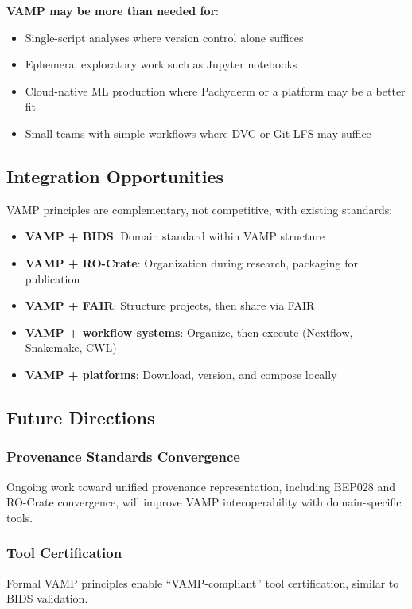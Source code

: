 \documentclass{article}
\begin{document}
\textbf{VAMP may be more than needed for}:
\begin{itemize}
    \item Single-script analyses where version control alone suffices
    \item Ephemeral exploratory work such as Jupyter notebooks
    \item Cloud-native ML production where Pachyderm or a platform may be a better fit
    \item Small teams with simple workflows where DVC or Git LFS may suffice
\end{itemize}

\subsection{Integration Opportunities}

VAMP principles are complementary, not competitive, with existing standards:
\begin{itemize}
    \item \textbf{VAMP + BIDS}: Domain standard within VAMP structure
    \item \textbf{VAMP + RO-Crate}: Organization during research, packaging for publication
    \item \textbf{VAMP + FAIR}: Structure projects, then share via FAIR
    \item \textbf{VAMP + workflow systems}: Organize, then execute (Nextflow, Snakemake, CWL)
    \item \textbf{VAMP + platforms}: Download, version, and compose locally
\end{itemize}

\subsection{Future Directions}

\subsubsection{Provenance Standards Convergence}
Ongoing work toward unified provenance representation, including BEP028 and RO-Crate convergence, will improve VAMP interoperability with domain-specific tools.

\subsubsection{Tool Certification}
Formal VAMP principles enable ``VAMP-compliant'' tool certification, similar to BIDS validation.
\end{document}

